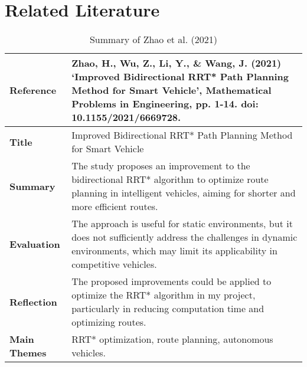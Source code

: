\documentclass[a4paper,12pt]{report}
\begin{document}
\section{Related Literature}

\begin{table}[H]
    \centering
    \begin{tabular}{|p{3cm}|p{10cm}|}
        \hline
        \textbf{Reference} & Zhao, H., Wu, Z., Li, Y., \& Wang, J. (2021) ‘Improved Bidirectional RRT* Path Planning Method for Smart Vehicle’, Mathematical Problems in Engineering, pp. 1-14. doi: 10.1155/2021/6669728. \\ \hline
        \textbf{Title} & Improved Bidirectional RRT* Path Planning Method for Smart Vehicle \\ \hline
        \textbf{Summary} & The study proposes an improvement to the bidirectional RRT* algorithm to optimize route planning in intelligent vehicles, aiming for shorter and more efficient routes. \\ \hline
        \textbf{Evaluation} & The approach is useful for static environments, but it does not sufficiently address the challenges in dynamic environments, which may limit its applicability in competitive vehicles. \\ \hline
        \textbf{Reflection} & The proposed improvements could be applied to optimize the RRT* algorithm in my project, particularly in reducing computation time and optimizing routes. \\ \hline
        \textbf{Main Themes} & RRT* optimization, route planning, autonomous vehicles. \\ \hline
    \end{tabular}
    \caption{Summary of Zhao et al. (2021)}
    \label{tab:zhao2021}
\end{table}
\end{document}
